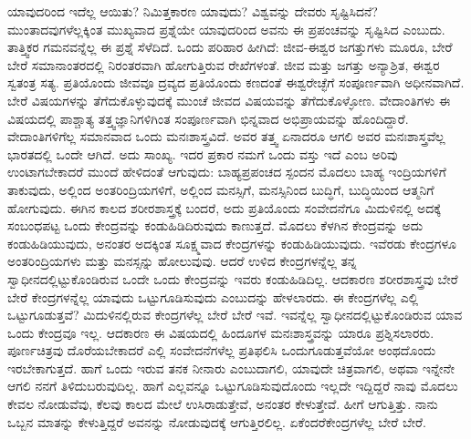 ಯಾವುದರಿಂದ ಇದೆಲ್ಲ ಆಯಿತು? ನಿಮಿತ್ತಕಾರಣ ಯಾವುದು? ವಿಶ್ವವನ್ನು ದೇವರು ಸೃಷ್ಟಿಸಿದನೆ? ಮುಂತಾದವುಗಳೆಲ್ಲಕ್ಕಿಂತ ಮುಖ್ಯವಾದ ಪ್ರಶ್ನೆಯೇ ಯಾವುದರಿಂದ ಅವನು ಈ ಪ್ರಪಂಚವನ್ನು ಸೃಷ್ಟಿಸಿದ ಎಂಬುದು. ತಾತ್ತ್ವಿಕರ ಗಮನವನ್ನೆಲ್ಲ ಈ ಪ್ರಶ್ನೆ ಸೆಳೆದಿದೆ. ಒಂದು ಪರಿಹಾರ ಹೀಗಿದೆ: ಜೀವ-ಈಶ್ವರ ಜಗತ್ತುಗಳು ಮೂರೂ, ಬೇರೆ ಬೇರೆ ಸಮಾನಾಂತರದಲ್ಲಿ ನಿರಂತರವಾಗಿ ಹೋಗುತ್ತಿರುವ ರೇಖೆಗಳಂತೆ. ಜೀವ ಮತ್ತು ಜಗತ್ತು ಅನ್ಯಾಶ್ರಿತ, ಈಶ್ವರ ಸ್ವತಂತ್ರ ಸತ್ಯ. ಪ್ರತಿಯೊಂದು ಜೀವವೂ ದ್ರವ್ಯದ ಪ್ರತಿಯೊಂದು ಕಣದಂತೆ ಈಶ್ವರೇಚ್ಛೆಗೆ ಸಂಪೂರ್ಣವಾಗಿ ಅಧೀನವಾಗಿದೆ. ಬೇರೆ ವಿಷಯಗಳನ್ನು ತೆಗೆದುಕೊಳ್ಳುವುದಕ್ಕೆ ಮುಂಚೆ ಜೀವದ ವಿಷಯವನ್ನು ತೆಗೆದುಕೊಳ್ಳೋಣ. ವೇದಾಂತಿಗಳು ಈ ವಿಷಯದಲ್ಲಿ ಪಾಶ್ಚಾತ್ಯ ತತ್ತ್ವಜ್ಞಾನಿಗಳಿಗಿಂತ ಸಂಪೂರ್ಣವಾಗಿ ಭಿನ್ನವಾದ ಅಭಿಪ್ರಾಯವನ್ನು ಹೊಂದಿದ್ದಾರೆ. ವೇದಾಂತಿಗಳಿಗೆಲ್ಲ ಸಮಾನವಾದ ಒಂದು ಮನಃಶಾಸ್ತ್ರವಿದೆ. ಅವರ ತತ್ತ್ವ ಏನಾದರೂ ಆಗಲಿ ಅವರ ಮನಃಶಾಸ್ತ್ರವೆಲ್ಲ ಭಾರತದಲ್ಲಿ ಒಂದೇ ಆಗಿದೆ. ಅದು ಸಾಂಖ್ಯ. ಇದರ ಪ್ರಕಾರ ನಮಗೆ ಒಂದು ವಸ್ತು ಇದೆ ಎಂಬ ಅರಿವು ಉಂಟಾಗಬೇಕಾದರೆ ಮುಂದೆ ಹೇಳಿದಂತೆ ಆಗುವುದು: ಬಾಹ್ಯಪ್ರಪಂಚದ ಸ್ಪಂದನ ಮೊದಲು ಬಾಹ್ಯ ಇಂದ್ರಿಯಗಳಿಗೆ ತಾಕುವುದು, ಅಲ್ಲಿಂದ ಅಂತರಿಂದ್ರಿಯಗಳಿಗೆ, ಅಲ್ಲಿಂದ ಮನಸ್ಸಿಗೆ, ಮನಸ್ಸಿನಿಂದ ಬುದ್ಧಿಗೆ, ಬುದ್ಧಿಯಿಂದ ಆತ್ಮನಿಗೆ ಹೋಗುವುದು. ಈಗಿನ ಕಾಲದ ಶರೀರಶಾಸ್ತ್ರಕ್ಕೆ ಬಂದರೆ, ಅದು ಪ್ರತಿಯೊಂದು ಸಂವೇದನೆಗೂ ಮಿದುಳಿನಲ್ಲಿ ಅದಕ್ಕೆ ಸಂಬಂಧಪಟ್ಟ ಒಂದು ಕೇಂದ್ರವನ್ನು ಕಂಡುಹಿಡಿದಿರುವುದು ಕಾಣುತ್ತದೆ. ಮೊದಲು ಕೆಳಗಿನ ಕೇಂದ್ರವನ್ನು ಅದು ಕಂಡುಹಿಡಿಯುವುದು, ಅನಂತರ ಅದಕ್ಕಿಂತ ಸೂಕ್ಷ್ಮವಾದ ಕೇಂದ್ರಗಳನ್ನು ಕಂಡುಹಿಡಿಯುವುದು. ಇವೆರಡು ಕೇಂದ್ರಗಳೂ ಅಂತರಿಂದ್ರಿಯಗಳು ಮತ್ತು ಮನಸ್ಸನ್ನು ಹೋಲುವುವು. ಆದರೆ ಉಳಿದ ಕೇಂದ್ರಗಳನ್ನೆಲ್ಲ ತನ್ನ ಸ್ವಾಧೀನದಲ್ಲಿಟ್ಟುಕೊಂಡಿರುವ ಒಂದೇ ಒಂದು ಕೇಂದ್ರವನ್ನು ಇವರು ಕಂಡುಹಿಡಿದಿಲ್ಲ. ಆದಕಾರಣ ಶರೀರಶಾಸ್ತ್ರವು ಬೇರೆ ಬೇರೆ ಕೇಂದ್ರಗಳನ್ನೆಲ್ಲ ಯಾವುದು ಒಟ್ಟುಗೂಡಿಸುವುದು ಎಂಬುದನ್ನು ಹೇಳಲಾರದು. ಈ ಕೇಂದ್ರಗಳೆಲ್ಲ ಎಲ್ಲಿ ಒಟ್ಟುಗೂಡುತ್ತವೆ? ಮಿದುಳಿನಲ್ಲಿರುವ ಕೇಂದ್ರಗಳೆಲ್ಲ ಬೇರೆ ಬೇರೆ ಇವೆ. ಇವನ್ನೆಲ್ಲ ಸ್ವಾಧೀನದಲ್ಲಿಟ್ಟುಕೊಂಡಿರುವ ಯಾವ ಒಂದು ಕೇಂದ್ರವೂ ಇಲ್ಲ. ಆದಕಾರಣ ಈ ವಿಷಯದಲ್ಲಿ ಹಿಂದೂಗಳ ಮನಃಶಾಸ್ತ್ರವನ್ನು ಯಾರೂ ಪ್ರಶ್ನಿಸಲಾರರು. ಪೂರ್ಣಚಿತ್ರವು ದೊರೆಯಬೇಕಾದರೆ ಎಲ್ಲಿ ಸಂವೇದನೆಗಳೆಲ್ಲ ಪ್ರತಿಫಲಿಸಿ ಒಂದುಗೂಡುತ್ತವೆಯೋ ಅಂಥದೊಂದು ಇರಬೇಕಾಗುತ್ತದೆ. ಹಾಗೆ ಒಂದು ಇರುವ ತನಕ ನೀನಾರು ಎಂಬುದಾಗಲಿ, ಯಾವುದೇ ಚಿತ್ರವಾಗಲಿ, ಅಥವಾ ಇನ್ನೇನೇ ಆಗಲಿ ನನಗೆ ತಿಳಿದುಬರುವುದಿಲ್ಲ. ಹಾಗೆ ಎಲ್ಲವನ್ನೂ ಒಟ್ಟುಗೂಡಿಸುವುದೊಂದು ಇಲ್ಲದೇ ಇದ್ದಿದ್ದರೆ ನಾವು ಮೊದಲು ಕೇವಲ ನೋಡುವೆವು, ಕೆಲವು ಕಾಲದ ಮೇಲೆ ಉಸಿರಾಡುತ್ತೇವೆ, ಅನಂತರ ಕೇಳುತ್ತೇವೆ. ಹೀಗೆ ಆಗುತ್ತಿತ್ತು. ನಾನು ಒಬ್ಬನ ಮಾತನ್ನು ಕೇಳುತ್ತಿದ್ದರೆ ಅವನನ್ನು ನೋಡುವುದಕ್ಕೆ ಆಗುತ್ತಿರಲಿಲ್ಲ. ಏಕೆಂದರೆ\break ಕೇಂದ್ರಗಳೆಲ್ಲ ಬೇರೆ ಬೇರೆ.

